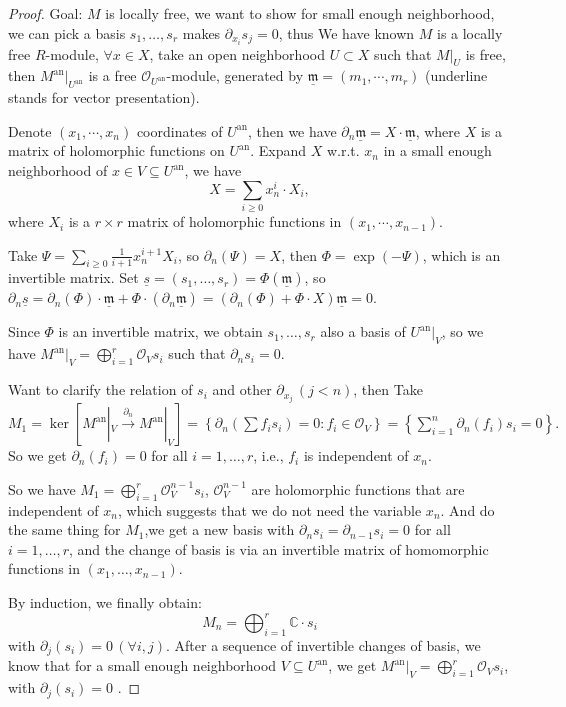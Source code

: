 \begin{proof}
    \quad

    Goal: $M$ is locally free, we want to show for small enough neighborhood, we can pick a basis $s_{1},\dots,s_{r}$ makes $\partial_{x_{i}}s_{j}=0$, thus
    We have known $M$ is a locally free $R$-module, $\forall x \in X$, take an open neighborhood $U \subset X$ such that $M|_U$ is free, then $M^{\mathrm{an}}|_{U^{\mathrm{an}}}$ is a free $\mathcal{O}_{U^{\mathrm{an}}}$-module, generated by $\underline{\mathfrak{m}} = (m_1, \cdots, m_r)$ (underline stands for vector presentation).

    Denote $(x_1, \cdots, x_n)$ coordinates of $U^{\mathrm{an}}$, then we have $\partial_{n} \underline{\mathfrak{m}} = X \cdot\underline{ \mathfrak{m}}$,
    where $X$ is a matrix of holomorphic functions on $U^{\mathrm{an}}$. Expand $X$ w.r.t. $x_n$ in a small enough neighborhood of
    $x\in V\subseteq U^{\mathrm{an}}$, we have $$X = \sum_{i\ge0} x_n^i \cdot X_i,$$where $X_i$ is a $r\times r$ matrix of holomorphic functions in $(x_1, \cdots, x_{n-1})$.

    Take $\Psi=\sum\limits_{i\ge 0} \frac{1}{i+1} x_{n}^{i+1}X_{i}$, so $\partial_{n}(\Psi)=X$, then $\Phi=\mathrm{\exp}(-\Psi)$, which is an invertible matrix. Set $\underline{s}=(s_{1},\dots,s_{r})=\Phi(\underline{\mathfrak{m}})$, so $\partial_{n}\underline{s}=\partial_{n}(\Phi)\cdot \underline{\mathfrak{m}}+\Phi \cdot(\partial_{n} \underline{\mathfrak{m}})=(\partial_{n}(\Phi)+\Phi \cdot X)\underline{\mathfrak{m}}=0$.

    Since $\Phi$ is an invertible matrix, we obtain $s_{1},\dots,s_{r}$ also a basis of $U^{\mathrm{an}}|_{V}$, so we have $M^{\mathrm{an}}|_{V}=\bigoplus\limits_{i=1}^{r}\mathcal{O}_{V}s_{i}$ such that $\partial_{n}s_{i}=0$.

    Want to clarify the relation of $s_{i}$ and other $\partial_{x_{j}}\, (j < n)$, then Take $M_1 = \ker[M^{\mathrm{an}}|_V \xrightarrow{\partial_n} M^{\mathrm{an}}|_V]=\left\{ \partial_{n}\left( \sum f_{i}s_{i} \right)=0:f_{i}\in \mathcal{O}_{V} \right\}=\left\{ \sum\limits_{i=1}^{n}\partial_{n}(f_{i})s_{i}=0 \right\}.$ So we get $\partial_n(f_i) = 0$ for all $i=1,\dots,r$, i.e., $f_{i}$ is independent of $x_{n}$.

    So we have $M_{1}=\bigoplus\limits_{i=1}^{r}\mathcal{O}_{V}^{n-1}s_{i}$, $\mathcal{O}_{V}^{n-1}$ are holomorphic functions that are independent of $x_{n}$, which suggests that we do not need the variable $x_{n}$. And do the same thing for $M_{1}$,we get a new basis with $\partial_{n}s_{i}=\partial_{n-1}s_{i}=0$ for all $i=1,\dots,r$, and the change of basis is via an invertible matrix of homomorphic functions in $(x_{1},\dots,x_{n-1})$.

    By induction, we finally obtain:  $$ M_n = \bigoplus_{i=1}^r \mathbb{C} \cdot s_i $$with $\partial_j(s_i) = 0 \, (\forall i, j)$. After a sequence of invertible changes of basis, we know that for a small enough neighborhood $V \subseteq U^{\mathrm{an}}$, we get $M^{\mathrm{an}}|_{V}=\bigoplus\limits_{i=1}^{r}\mathcal{O}_{V}s_{i}$, with $\partial_{j}(s_{i})=0$ .
\end{proof}

